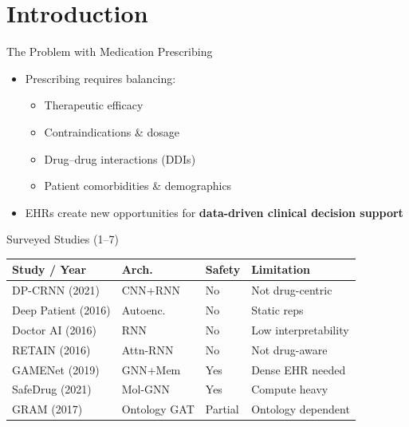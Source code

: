 \section{Introduction}

\begin{frame}{The Problem with Medication Prescribing}
  \begin{itemize}
    \item Prescribing requires balancing:
    \begin{itemize}
      \item Therapeutic efficacy
      \item Contraindications \& dosage
      \item Drug--drug interactions (DDIs)
      \item Patient comorbidities \& demographics
    \end{itemize}
    \pause
    \item EHRs create new opportunities for \textbf{data-driven clinical decision support}
  \end{itemize}
\end{frame}

\begin{frame}{Surveyed Studies (1--7)}
\small
\begin{tabularx}{\textwidth}{@{}p{} l l X@{}}
\toprule
\textbf{Study / Year} & \textbf{Arch.} & \textbf{Safety} & \textbf{Limitation} \\
\midrule
DP-CRNN (2021) \cite{zhou2021dpcrnn} & CNN+RNN & No & Not drug-centric \\
Deep Patient (2016) \cite{miotto2016deep} & Autoenc. & No & Static reps \\
Doctor AI (2016) \cite{choi2016doctorai} & RNN & No & Low interpretability \\
RETAIN (2016) \cite{choi2016retain} & Attn-RNN & No & Not drug-aware \\
GAMENet (2019) \cite{shang2019gamenet} & GNN+Mem & Yes & Dense EHR needed \\
SafeDrug (2021) \cite{lee2021safedrug} & Mol-GNN & Yes & Compute heavy \\
GRAM (2017) \cite{choi2017gram} & Ontology GAT & Partial & Ontology dependent \\
\bottomrule
\end{tabularx}
\end{frame}

